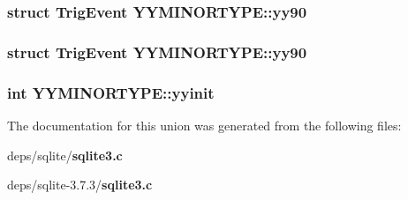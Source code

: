 \subsubsection{\setlength{\rightskip}{0pt plus 5cm}struct \bf{Trig\-Event} \bf{YYMINORTYPE::yy90}}\label{unionYYMINORTYPE_f09f7c429d0dc4390b35b7f46bb53e89}


\subsubsection{\setlength{\rightskip}{0pt plus 5cm}struct \bf{Trig\-Event} \bf{YYMINORTYPE::yy90}}\label{unionYYMINORTYPE_f09f7c429d0dc4390b35b7f46bb53e89}


\subsubsection{\setlength{\rightskip}{0pt plus 5cm}int \bf{YYMINORTYPE::yyinit}}\label{unionYYMINORTYPE_94f635ba792c817afdd6884704832253}




The documentation for this union was generated from the following files:\begin{CompactItemize}
\item 
deps/sqlite/\bf{sqlite3.c}\item 
deps/sqlite-3.7.3/\bf{sqlite3.c}\end{CompactItemize}
